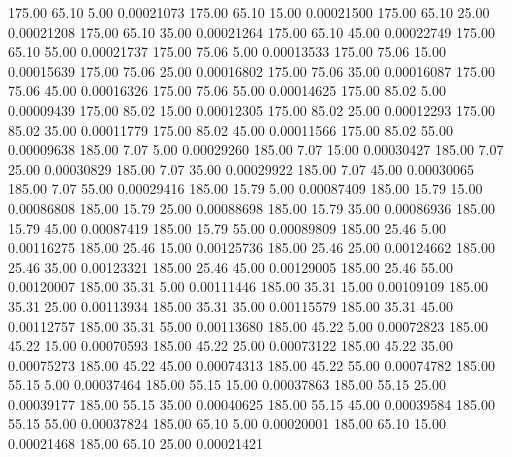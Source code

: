     175.00     65.10      5.00     0.00021073
    175.00     65.10     15.00     0.00021500
    175.00     65.10     25.00     0.00021208
    175.00     65.10     35.00     0.00021264
    175.00     65.10     45.00     0.00022749
    175.00     65.10     55.00     0.00021737
    175.00     75.06      5.00     0.00013533
    175.00     75.06     15.00     0.00015639
    175.00     75.06     25.00     0.00016802
    175.00     75.06     35.00     0.00016087
    175.00     75.06     45.00     0.00016326
    175.00     75.06     55.00     0.00014625
    175.00     85.02      5.00     0.00009439
    175.00     85.02     15.00     0.00012305
    175.00     85.02     25.00     0.00012293
    175.00     85.02     35.00     0.00011779
    175.00     85.02     45.00     0.00011566
    175.00     85.02     55.00     0.00009638
    185.00      7.07      5.00     0.00029260
    185.00      7.07     15.00     0.00030427
    185.00      7.07     25.00     0.00030829
    185.00      7.07     35.00     0.00029922
    185.00      7.07     45.00     0.00030065
    185.00      7.07     55.00     0.00029416
    185.00     15.79      5.00     0.00087409
    185.00     15.79     15.00     0.00086808
    185.00     15.79     25.00     0.00088698
    185.00     15.79     35.00     0.00086936
    185.00     15.79     45.00     0.00087419
    185.00     15.79     55.00     0.00089809
    185.00     25.46      5.00     0.00116275
    185.00     25.46     15.00     0.00125736
    185.00     25.46     25.00     0.00124662
    185.00     25.46     35.00     0.00123321
    185.00     25.46     45.00     0.00129005
    185.00     25.46     55.00     0.00120007
    185.00     35.31      5.00     0.00111446
    185.00     35.31     15.00     0.00109109
    185.00     35.31     25.00     0.00113934
    185.00     35.31     35.00     0.00115579
    185.00     35.31     45.00     0.00112757
    185.00     35.31     55.00     0.00113680
    185.00     45.22      5.00     0.00072823
    185.00     45.22     15.00     0.00070593
    185.00     45.22     25.00     0.00073122
    185.00     45.22     35.00     0.00075273
    185.00     45.22     45.00     0.00074313
    185.00     45.22     55.00     0.00074782
    185.00     55.15      5.00     0.00037464
    185.00     55.15     15.00     0.00037863
    185.00     55.15     25.00     0.00039177
    185.00     55.15     35.00     0.00040625
    185.00     55.15     45.00     0.00039584
    185.00     55.15     55.00     0.00037824
    185.00     65.10      5.00     0.00020001
    185.00     65.10     15.00     0.00021468
    185.00     65.10     25.00     0.00021421
